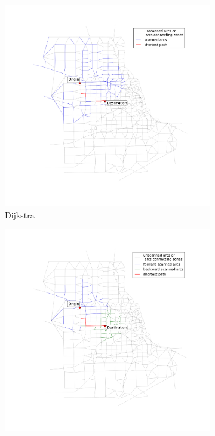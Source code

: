 \begin{figure}
    \centering
    \begin{subfigure}{.5\textwidth}
        \centering
        \includegraphics[width=\textwidth,trim=120px 120px 48px 120px,clip]{img/chicago_dijkstra2}
        \caption{Dijkstra}
        \label{fig:chicago_dijkstra2}
    \end{subfigure}%
    \begin{subfigure}{.5\textwidth}
        \centering
        \includegraphics[width=\textwidth,trim=120px 120px 48px 120px,clip]{img/chicago_bidirect2}

\end{subfigure}
\end{figure}
